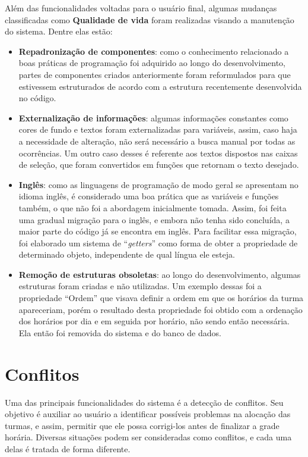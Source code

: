 Além das funcionalidades voltadas para o usuário final, algumas mudanças classificadas como \textbf{Qualidade de vida} foram realizadas visando a manutenção do sistema. Dentre elas estão:

\begin{itemize}
  \item \textbf{Repadronização de componentes}: como o conhecimento relacionado a boas práticas de programação foi adquirido ao longo do desenvolvimento, partes de componentes criados anteriormente foram reformulados para que estivessem estruturados de acordo com a estrutura recentemente desenvolvida no código.
  \item \textbf{Externalização de informações}: algumas informações constantes como cores de fundo e textos foram externalizadas para variáveis, assim, caso haja a necessidade de alteração, não será necessário a busca manual por todas as ocorrências. Um outro caso desses é referente aos textos dispostos nas caixas de seleção, que foram convertidos em funções que retornam o texto desejado.
  \item \textbf{Inglês}: como as linguagens de programação de modo geral se apresentam no idioma inglês, é considerado uma boa prática que as variáveis e funções também, o que não foi a abordagem inicialmente tomada. Assim, foi feita uma gradual migração para o inglês, e embora não tenha sido concluída, a maior parte do código já se encontra em inglês. Para facilitar essa migração, foi elaborado um sistema de ``\textit{getters}'' como forma de obter a propriedade de determinado objeto, independente de qual língua ele esteja.
  \item \textbf{Remoção de estruturas obsoletas}: ao longo do desenvolvimento, algumas estruturas foram criadas e não utilizadas. Um exemplo dessas foi a propriedade ``Ordem'' que visava definir a ordem em que os horários da turma apareceriam, porém o resultado desta propriedade foi obtido com a ordenação dos horários por dia e em seguida por horário, não sendo então necessária. Ela então foi removida do sistema e do banco de dados.
\end{itemize}

\section{Conflitos}\label{sec:conflitos} %

Uma das principais funcionalidades do sistema é a detecção de conflitos. Seu objetivo é auxiliar ao usuário a identificar possíveis problemas na alocação das turmas, e assim, permitir que ele possa corrigi-los antes de finalizar a grade horária. Diversas situações podem ser consideradas como conflitos, e cada uma delas é tratada de forma diferente.


